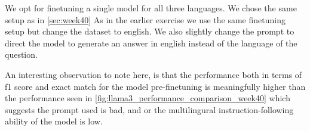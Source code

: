 \documentclass[11pt]{article}
\begin{document}
We opt for finetuning a single model for all three languages. We chose the same setup as in \ref{sec:week40}
As in the earlier exercise we use the same finetuning setup but change the dataset to english. 
We also slightly change the prompt to direct the model to generate an answer in english instead of the language of the question.


\begin{table}[ht]
    \centering
    \label{tab:week41_performance_comparison}
    \caption{Performance comparison of pre-finetuned and finetuned models for English answer generation}
\end{table}

An interesting observation to note here, is that the performance both in terms of f1 score and exact match for the model pre-finetuning is meaningfully higher 
than the performance seen in \ref{fig:llama3_performance_comparison_week40} which suggests the prompt used is bad, and or the multilingural instruction-following ability of the model is low. 


\begin{table}[ht]
    \centering
    \label{tab:week41_non_answerable_performance}
    \caption{Performance comparison of pre-finetuned and finetuned models for English answer generation}
\end{table}
\end{document}
